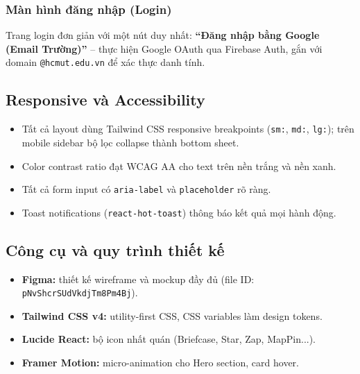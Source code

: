 \subsubsection{Màn hình đăng nhập (Login)}

Trang login đơn giản với một nút duy nhất:
\textbf{``Đăng nhập bằng Google (Email Trường)''} -- thực hiện Google OAuth qua Firebase Auth,
gắn với domain \texttt{@hcmut.edu.vn} để xác thực danh tính.

\subsection{Responsive và Accessibility}

\begin{itemize}
  \item Tất cả layout dùng Tailwind CSS responsive breakpoints (\texttt{sm:}, \texttt{md:},
    \texttt{lg:}); trên mobile sidebar bộ lọc collapse thành bottom sheet.
  \item Color contrast ratio đạt WCAG AA cho text trên nền trắng và nền xanh.
  \item Tất cả form input có \texttt{aria-label} và \texttt{placeholder} rõ ràng.
  \item Toast notifications (\texttt{react-hot-toast}) thông báo kết quả mọi hành động.
\end{itemize}

\subsection{Công cụ và quy trình thiết kế}

\begin{itemize}
  \item \textbf{Figma:} thiết kế wireframe và mockup đầy đủ (file ID: \texttt{pNvShcrSUdVkdjTm8Pm4Bj}).
  \item \textbf{Tailwind CSS v4:} utility-first CSS, CSS variables làm design tokens.
  \item \textbf{Lucide React:} bộ icon nhất quán (Briefcase, Star, Zap, MapPin...).
  \item \textbf{Framer Motion:} micro-animation cho Hero section, card hover.
\end{itemize}
